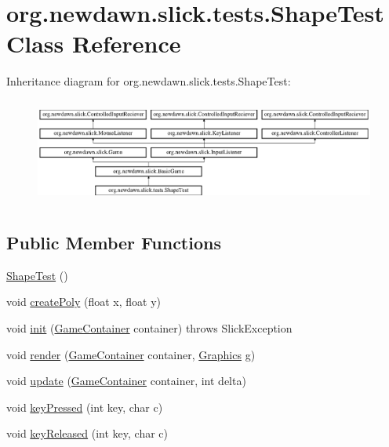 \hypertarget{classorg_1_1newdawn_1_1slick_1_1tests_1_1_shape_test}{}\section{org.\+newdawn.\+slick.\+tests.\+Shape\+Test Class Reference}
\label{classorg_1_1newdawn_1_1slick_1_1tests_1_1_shape_test}
Inheritance diagram for org.\+newdawn.\+slick.\+tests.\+Shape\+Test\+:\begin{figure}[H]
\begin{center}
\leavevmode
\includegraphics[height=3.522012cm]{classorg_1_1newdawn_1_1slick_1_1tests_1_1_shape_test}
\end{center}
\end{figure}
\subsection*{Public Member Functions}
\begin{DoxyCompactItemize}
\item 
\mbox{\hyperlink{classorg_1_1newdawn_1_1slick_1_1tests_1_1_shape_test_a353b82c407ab383e09830031e6eadd35}{Shape\+Test}} ()
\item 
void \mbox{\hyperlink{classorg_1_1newdawn_1_1slick_1_1tests_1_1_shape_test_a6bd48796d58ab51d39c6619f418097ca}{create\+Poly}} (float x, float y)
\item 
void \mbox{\hyperlink{classorg_1_1newdawn_1_1slick_1_1tests_1_1_shape_test_adf4c54dafed85ae929d022be9734b9ca}{init}} (\mbox{\hyperlink{classorg_1_1newdawn_1_1slick_1_1_game_container}{Game\+Container}} container)  throws Slick\+Exception 
\item 
void \mbox{\hyperlink{classorg_1_1newdawn_1_1slick_1_1tests_1_1_shape_test_ac2f9e4424e48634d0d2c8dc30df974db}{render}} (\mbox{\hyperlink{classorg_1_1newdawn_1_1slick_1_1_game_container}{Game\+Container}} container, \mbox{\hyperlink{classorg_1_1newdawn_1_1slick_1_1_graphics}{Graphics}} g)
\item 
void \mbox{\hyperlink{classorg_1_1newdawn_1_1slick_1_1tests_1_1_shape_test_a986222bcf6c780f48ffb0f379c2f2ec8}{update}} (\mbox{\hyperlink{classorg_1_1newdawn_1_1slick_1_1_game_container}{Game\+Container}} container, int delta)
\item 
void \mbox{\hyperlink{classorg_1_1newdawn_1_1slick_1_1tests_1_1_shape_test_ab835ed469d21abeff031aa2c0e378bb7}{key\+Pressed}} (int key, char c)
\item 
void \mbox{\hyperlink{classorg_1_1newdawn_1_1slick_1_1tests_1_1_shape_test_a9fe0925a1f2298dc0e2d64f51da6459a}{key\+Released}} (int key, char c)
\end{DoxyCompactItemize}
